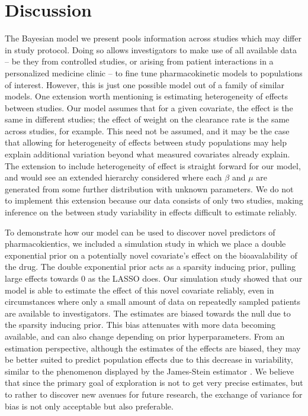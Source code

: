 \section{Discussion}


The Bayesian model we present pools information across studies which may differ in study protocol.  Doing so allows investigators to make use of all available data -- be they from controlled studies, or arising from patient interactions in a personalized medicine clinic -- to fine tune pharmacokinetic models to populations of interest. However, this is just one possible model out of a family of similar models. One extension worth mentioning is estimating heterogeneity of effects between studies.  Our model assumes that for a given covariate, the effect is the same in different studies; the effect of weight on the clearance rate is the same across studies, for example.  This need not be assumed, and it may be the case that allowing for heterogeneity of effects between study populations may help explain additional variation beyond what measured covariates already explain.  The extension to include heterogeneity of effect is straight forward for our model, and would see an extended hierarchy considered where each $\beta$ and $\mu$ are generated from some further distribution with unknown parameters. We do not to implement this extension because our data consists of only two studies, making inference on the between study variability in effects difficult to estimate reliably.

To demonstrate how our model can be used to discover novel predictors of pharmacokientics, we included a simulation study in which we place a double exponential prior on a potentially novel covariate's effect on the bioavalability of the drug.  The double exponential prior acts as a sparsity inducing prior, pulling large effects towards 0 as the LASSO does. Our simulation study showed that our model is able to estimate the effect of this novel covariate reliably, even in circumstances where only a small amount of data on repeatedly sampled patients are available to investigators.  The estimates are biased towards the null due to the sparsity inducing prior. This bias attenuates with more data becoming available, and can also change depending on prior hyperparameters. From an estimation perspective, although the estimates of the effects are biased, they may be better suited to predict population effects due to this decrease in variability, similar to the phenomenon displayed by the James-Stein estimator \cite{stein1956inadmissibility,james1992estimation}.  We believe that since the primary goal of exploration is not to get very precise estimates, but to rather to discover new avenues for future research, the exchange of variance for bias is not only acceptable but also preferable.


